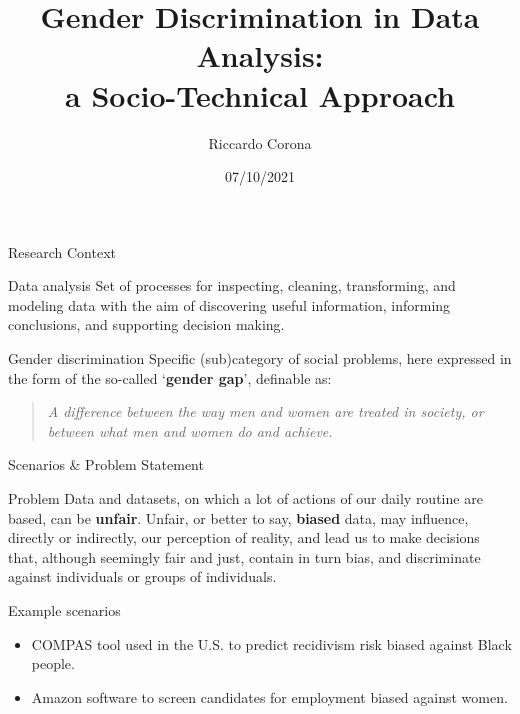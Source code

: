 \documentclass[usenames,dvipsnames]{beamer}
\title{Gender Discrimination in Data Analysis:\\a Socio-Technical Approach}
\author{Riccardo Corona}
\date{07/10/2021}
\begin{document}
    \begin{frame}
        \maketitle
    \end{frame}
    
    
    \begin{frame}{Research Context}
        \begin{block}{Data analysis}
            Set of processes for inspecting, cleaning, transforming, and modeling data with the aim of discovering useful information, informing conclusions, and supporting decision making.
        \end{block}
        \begin{block}{Gender discrimination}
            Specific (sub)category of social problems, here expressed in the form of the so-called `\textbf{gender gap}', definable as:
            \begin{quote}
            \emph{A difference between the way men and women are treated in society, or between what men and women do and achieve.} \parencite{cambridge2013gender}
            \end{quote}
        \end{block}
    \end{frame}
    
    
    \begin{frame}{Scenarios \& Problem Statement}
        \begin{block}{Problem}
            Data and datasets, on which a lot of actions of our daily routine are based, can be \textbf {unfair}. Unfair, or better to say, \textbf{biased} data, may influence, directly or indirectly, our perception of reality, and lead us to make decisions that, although seemingly fair and just, contain in turn bias, and discriminate against individuals or groups of individuals.
        \end{block}
        \begin{exampleblock}{Example scenarios}
            \begin{itemize}
                \item \textcolor{greenPolimi}{COMPAS} tool used in the U.S. to predict recidivism risk biased against Black people. \emph{\parencite{angwin2016machine}}
                \item \textcolor{greenPolimi}{Amazon} software to screen candidates for employment biased against women. \emph{\parencite{dastin2018amazon}}
            \end{itemize}
        \end{exampleblock}
    \end{frame}
    
\end{document}
